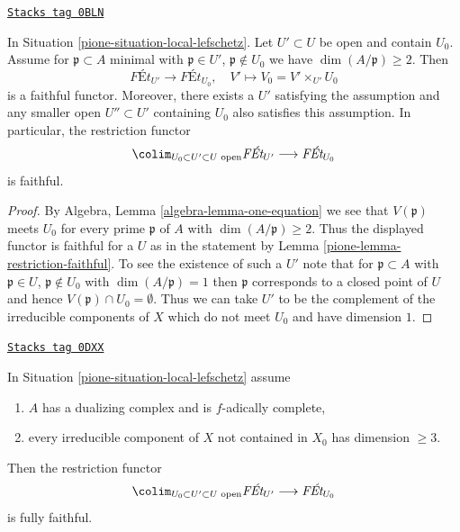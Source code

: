 \begin{lemma}
\label{pione-lemma-faithful-general}
\href{https://stacks.math.columbia.edu/tag/0BLN}{\texttt{Stacks tag 0BLN}}

In Situation \ref{pione-situation-local-lefschetz}. Let $U' \subset U$
be open and contain $U_0$. Assume for $\mathfrak p \subset A$ minimal
with $\mathfrak p \in U'$, $\mathfrak p \not \in U_0$ we have
$\dim(A/\mathfrak p) \geq 2$. Then
$$
\textit{F\'Et}_{U'} \longrightarrow \textit{F\'Et}_{U_0},\quad
V' \longmapsto V_0 = V' \times_{U'} U_0
$$
is a faithful functor. Moreover, there exists a $U'$ satisfying
the assumption and any smaller open $U'' \subset U'$ containing
$U_0$ also satisfies this assumption. In particular, the restriction
functor
$$
\colim_{U_0 \subset U' \subset U\text{ open}} \textit{F\'Et}_{U'}
\longrightarrow
\textit{F\'Et}_{U_0}
$$
is faithful.
\end{lemma}

\begin{proof}

By Algebra, Lemma \ref{algebra-lemma-one-equation}
we see that $V(\mathfrak p)$ meets $U_0$ for
every prime $\mathfrak p$ of $A$ with $\dim(A/\mathfrak p) \geq 2$.
Thus the displayed functor is faithful for a $U$ as in the statement
by Lemma \ref{pione-lemma-restriction-faithful}.
To see the existence of such a $U'$ note that for
$\mathfrak p \subset A$ with $\mathfrak p \in U$,
$\mathfrak p \not \in U_0$ with $\dim(A/\mathfrak p) = 1$
then $\mathfrak p$ corresponds to a closed point of $U$
and hence $V(\mathfrak p) \cap U_0 = \emptyset$.
Thus we can take $U'$ to be the complement of the irreducible
components of $X$ which do not meet $U_0$ and have dimension $1$.
\end{proof}

\begin{lemma}
\label{pione-lemma-fully-faithful-general-better}
\href{https://stacks.math.columbia.edu/tag/0DXX}{\texttt{Stacks tag 0DXX}}

In Situation \ref{pione-situation-local-lefschetz} assume
\begin{enumerate}
\item $A$ has a dualizing complex and is $f$-adically complete,
\item every irreducible component of $X$ not contained in $X_0$
has dimension $\geq 3$.
\end{enumerate}
Then the restriction functor
$$
\colim_{U_0 \subset U' \subset U\text{ open}} \textit{F\'Et}_{U'}
\longrightarrow
\textit{F\'Et}_{U_0}
$$
is fully faithful.
\end{lemma}

